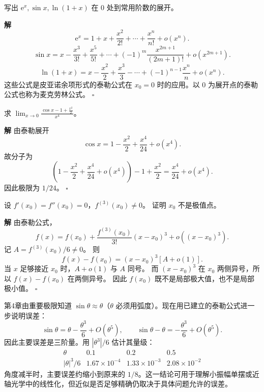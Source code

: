 \documentclass[fontset=fandol]{ctexart}
\newenvironment{solution}{\par\noindent\textbf{解}\quad}{\hfill$\square$\par\vspace{0.8em}}
\newcommand{\ee}{\mathrm{e}}
\begin{document}
\begin{example}
写出 $\ee^x,\sin x,\ln(1+x)$ 在 $0$ 处到常用阶数的展开。
\end{example}
\begin{solution}
\[
\ee^x=1+x+\frac{x^2}{2!}+\cdots+\frac{x^n}{n!}+o(x^n).
\]
\[
\sin x=x-\frac{x^3}{3!}+\frac{x^5}{5!}+\cdots+(-1)^m\frac{x^{2m+1}}{(2m+1)!}+o(x^{2m+1}).
\]
\[
\ln(1+x)=x-\frac{x^2}{2}+\frac{x^3}{3}-\cdots+(-1)^{n-1}\frac{x^n}{n}+o(x^n).
\]
这些公式是皮亚诺余项形式的泰勒公式在 \(x_0=0\) 时的应用。以 \(0\) 为展开点的泰勒公式也称为麦克劳林公式。
\end{solution}

\begin{example}[极限]
求 $\displaystyle\lim_{x\to0}\frac{\cos x-1+\frac{x^2}{2}}{x^4}$。
\end{example}
\begin{solution}
由泰勒展开
\[
\cos x=1-\frac{x^2}{2}+\frac{x^4}{24}+o(x^4).
\]
故分子为
\[
\left(1-\frac{x^2}{2}+\frac{x^4}{24}+o(x^4)\right)-1+\frac{x^2}{2}
=\frac{x^4}{24}+o(x^4).
\]
因此极限为 $1/24$。
\end{solution}

\begin{example}[用泰勒判别极值]
设 $f'(x_0)=f''(x_0)=0$，$f^{(3)}(x_0)\neq0$。 证明 $x_0$ 不是极值点。
\end{example}
\begin{solution}
由泰勒公式，
\[
f(x)=f(x_0)+\frac{f^{(3)}(x_0)}{3!}(x-x_0)^3+o((x-x_0)^3).
\]
记 $A=f^{(3)}(x_0)/6\neq0$。 则
\[
f(x)-f(x_0)=(x-x_0)^3[A+o(1)].
\]
当 $x$ 足够接近 $x_0$ 时，$A+o(1)$ 与 $A$ 同号。 而 $(x-x_0)^3$ 在 $x_0$ 两侧异号，所以 $f(x)-f(x_0)$ 在两侧异号。 因此 $f(x_0)$ 既不是局部极大值，也不是局部极小值。
\end{solution}

\begin{application}
第4章由重要极限知道 $\sin\theta\approx\theta$（$\theta$ 必须用弧度）。现在用已建立的泰勒公式进一步说明误差：
\[
\sin\theta=\theta-\frac{\theta^3}{6}+O(\theta^5),
\qquad
\sin\theta-\theta=-\frac{\theta^3}{6}+O(\theta^5).
\]
因此主要误差是三阶量。用 $|\theta^3|/6$ 估计其量级：
\[
\begin{array}{c|ccc}
\theta&0.1&0.2&0.5\\ \hline
|\theta|^3/6&1.67\times10^{-4}&1.33\times10^{-3}&2.08\times10^{-2}
\end{array}
\]
角度减半时，主要误差约缩小到原来的 $1/8$。这一结论可用于理解小振幅单摆或近轴光学中的线性化，但近似是否足够精确仍取决于具体问题允许的误差。
\end{application}
\end{document}
